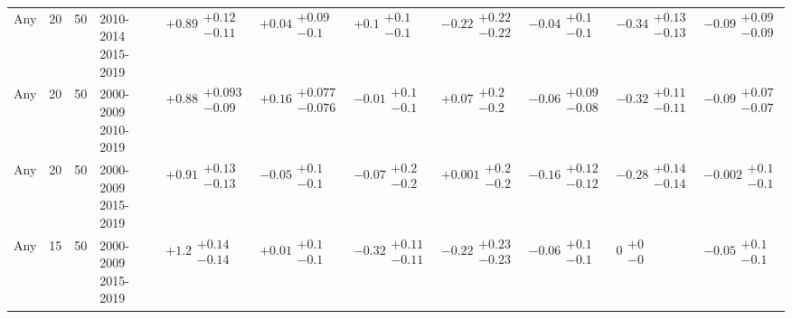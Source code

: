 \begin{table}[H]
\begin{tabular}{lrrllllllll}
Any & 20 & 50 & \makecell{2010-2014 \\ 2015-2019} & $\bm{+0.89}\substack{+0.12 \\ -0.11}$ & $+0.04\substack{+0.09 \\ -0.1}$ & $+0.1\substack{+0.1 \\ -0.1}$ & $\bm{-0.22}\substack{+0.22 \\ -0.22}$ & $-0.04\substack{+0.1 \\ -0.1}$ & $\bm{-0.34}\substack{+0.13 \\ -0.13}$ & $\bm{-0.09}\substack{+0.09 \\ -0.09}$ \\
Any & 20 & 50 & \makecell{2000-2009 \\ 2010-2019} & $\bm{+0.88}\substack{+0.093 \\ -0.09}$ & $\bm{+0.16}\substack{+0.077 \\ -0.076}$ & $-0.01\substack{+0.1 \\ -0.1}$ & $+0.07\substack{+0.2 \\ -0.2}$ & $-0.06\substack{+0.09 \\ -0.08}$ & $\bm{-0.32}\substack{+0.11 \\ -0.11}$ & $\bm{-0.09}\substack{+0.07 \\ -0.07}$ \\
Any & 20 & 50 & \makecell{2000-2009 \\ 2015-2019} & $\bm{+0.91}\substack{+0.13 \\ -0.13}$ & $-0.05\substack{+0.1 \\ -0.1}$ & $-0.07\substack{+0.2 \\ -0.2}$ & $+0.001\substack{+0.2 \\ -0.2}$ & $\bm{-0.16}\substack{+0.12 \\ -0.12}$ & $\bm{-0.28}\substack{+0.14 \\ -0.14}$ & $-0.002\substack{+0.1 \\ -0.1}$ \\
Any & 15 & 50 & \makecell{2000-2009 \\ 2015-2019} & $\bm{+1.2}\substack{+0.14 \\ -0.14}$ & $+0.01\substack{+0.1 \\ -0.1}$ & $\bm{-0.32}\substack{+0.11 \\ -0.11}$ & $-0.22\substack{+0.23 \\ -0.23}$ & $-0.06\substack{+0.1 \\ -0.1}$ & $0\substack{+0 \\ -0}$ & $-0.05\substack{+0.1 \\ -0.1}$ \\

\end{tabular}
\end{table}

